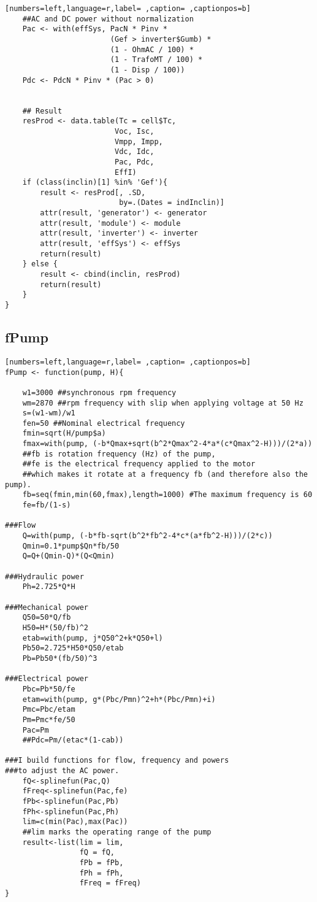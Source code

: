 \begin{lstlisting}[numbers=left,language=r,label= ,caption= ,captionpos=b]
    ##AC and DC power without normalization
    Pac <- with(effSys, PacN * Pinv *
                        (Gef > inverter$Gumb) *
                        (1 - OhmAC / 100) *
                        (1 - TrafoMT / 100) *
                        (1 - Disp / 100))
    Pdc <- PdcN * Pinv * (Pac > 0)


    ## Result
    resProd <- data.table(Tc = cell$Tc,
                         Voc, Isc,
                         Vmpp, Impp,
                         Vdc, Idc,
                         Pac, Pdc,
                         EffI)
    if (class(inclin)[1] %in% 'Gef'){
        result <- resProd[, .SD,
                          by=.(Dates = indInclin)]
        attr(result, 'generator') <- generator
        attr(result, 'module') <- module
        attr(result, 'inverter') <- inverter
        attr(result, 'effSys') <- effSys
        return(result)
    } else {
        result <- cbind(inclin, resProd)
        return(result)
    }
}
\end{lstlisting}
\subsection{fPump}
\label{sec:orgdd94e37}
\begin{lstlisting}[numbers=left,language=r,label= ,caption= ,captionpos=b]
fPump <- function(pump, H){

    w1=3000 ##synchronous rpm frequency
    wm=2870 ##rpm frequency with slip when applying voltage at 50 Hz
    s=(w1-wm)/w1
    fen=50 ##Nominal electrical frequency
    fmin=sqrt(H/pump$a)
    fmax=with(pump, (-b*Qmax+sqrt(b^2*Qmax^2-4*a*(c*Qmax^2-H)))/(2*a))
    ##fb is rotation frequency (Hz) of the pump,  
    ##fe is the electrical frequency applied to the motor
    ##which makes it rotate at a frequency fb (and therefore also the pump).
    fb=seq(fmin,min(60,fmax),length=1000) #The maximum frequency is 60
    fe=fb/(1-s)

###Flow
    Q=with(pump, (-b*fb-sqrt(b^2*fb^2-4*c*(a*fb^2-H)))/(2*c))
    Qmin=0.1*pump$Qn*fb/50
    Q=Q+(Qmin-Q)*(Q<Qmin)

###Hydraulic power
    Ph=2.725*Q*H

###Mechanical power
    Q50=50*Q/fb
    H50=H*(50/fb)^2
    etab=with(pump, j*Q50^2+k*Q50+l)
    Pb50=2.725*H50*Q50/etab
    Pb=Pb50*(fb/50)^3

###Electrical power
    Pbc=Pb*50/fe
    etam=with(pump, g*(Pbc/Pmn)^2+h*(Pbc/Pmn)+i)
    Pmc=Pbc/etam
    Pm=Pmc*fe/50
    Pac=Pm
    ##Pdc=Pm/(etac*(1-cab))

###I build functions for flow, frequency and powers
###to adjust the AC power.
    fQ<-splinefun(Pac,Q)
    fFreq<-splinefun(Pac,fe)
    fPb<-splinefun(Pac,Pb)
    fPh<-splinefun(Pac,Ph)
    lim=c(min(Pac),max(Pac))
    ##lim marks the operating range of the pump
    result<-list(lim = lim,
                 fQ = fQ,
                 fPb = fPb,
                 fPh = fPh,
                 fFreq = fFreq)
}
\end{lstlisting}
